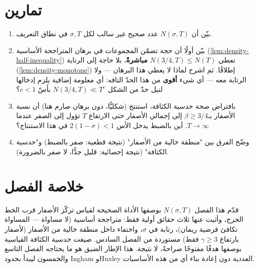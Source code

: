 \section{تمارين}

\begin{enumerate}
  \item بيّن أن \(N(\sigma,T)\) عدد صحيح غير سالب لكل \(\sigma,T\) في
  نطاق التعريف.
  \item بيّن أولًا أن حجة تضمّن المجموعات في برهان المتراجحة الأساسية
  (\ref{lem:density-half-inequality}) تعطي \(N(3/4,T)\le N(T)\)
  \textbf{مباشرةً}، بلا حاجة إلى الرتابة
  (\ref{lem:density-monotone}) إطلاقًا. ثم اشرح لماذا لا يعطي هذا
  البرهان — ولا الرتابة معه — أي شيء \textbf{أقوى} من هذا الحدّ التافه:
  أي معلومة إضافية يلزم إدخالها لنيل حدّ من الشكل
  \(N(3/4,T)\ll T^{c}\) بأسّ \(c<1\)؟
  \item بافتراض صحة حدسية الكثافة، استنتج (شكليًّا، دون برهان صارم هنا)
  أن نسبة الأصفار بـ\(\beta\ge3/4\) إلى إجمالي الأصفار حتى الارتفاع
  \(T\) تؤول إلى الصفر عندما \(T\to\infty\). أين بالضبط يدخل الأس
  \(2(1-\sigma)<1\) في هذا الاستنتاج؟
  \item وضّح الفرق بين "منطقة خالية من الأصفار" (نتيجة قطعية: صفر بالضبط)
  و"حدسية الكثافة" (نتيجة إحصائية: قليل جدًّا، لا صفر بالضرورة).
\end{enumerate}

\section{خلاصة الفصل}

قدّم هذا الفصل \(N(\sigma,T)\) بوصفها الأداة الصحيحة لقياس تركّز الأصفار
قرب الخط الحرج، وأثبت عنها ثلاث حقائق أولية فقط: متراجحة أساسية (لا
مساواة — المساواة تكافئ فرضية ريمان)، رتابة في \(\sigma\)، واختفاء داخل
منطقة خالية من الأصفار (لأصفار بارتفاع \(\gamma\ge3\) فقط) مستوردة من
الفصل السادس. صيغت حدسية الكثافة
القياسية بوصفها هدفًا مفتوحًا صراحةً، لا نتيجة. هذا الإطار الضيق هو ما
يحتاجه الفصل التاسع والخمسون ليبدأ بحدود Ingham وHuxley العددية دون إعادة بناء
أي من هذه الأساسيات.
